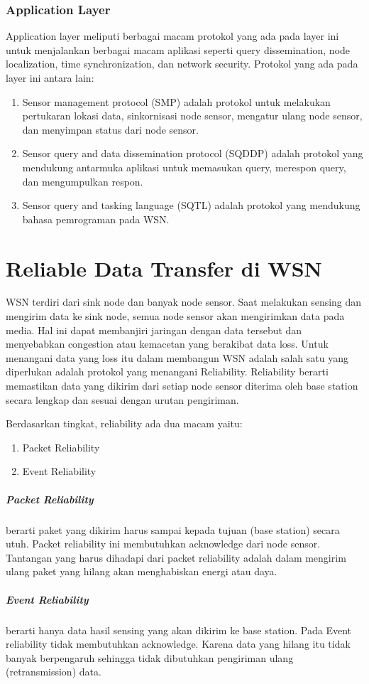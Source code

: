 \subsubsection{Application Layer}
Application layer meliputi berbagai macam protokol yang ada pada layer ini untuk menjalankan berbagai macam aplikasi seperti query dissemination, node localization, time synchronization, dan network security. Protokol yang ada pada layer ini antara lain:
\begin{enumerate}
	\item Sensor management protocol (SMP) adalah protokol untuk melakukan pertukaran lokasi data, sinkornisasi node sensor, mengatur ulang node sensor, dan menyimpan status dari node sensor.
	\item Sensor query and data dissemination protocol (SQDDP) adalah protokol yang mendukung antarmuka aplikasi untuk memasukan query, merespon query, dan mengumpulkan respon.
	\item Sensor query and tasking language (SQTL) adalah protokol yang mendukung bahasa pemrograman pada WSN.
\end{enumerate}


\section{Reliable Data Transfer di WSN}
WSN terdiri dari sink node dan banyak node sensor. Saat melakukan sensing dan mengirim data ke sink node, semua node sensor akan mengirimkan data pada media. Hal ini dapat membanjiri jaringan dengan data tersebut dan menyebabkan congestion atau kemacetan yang berakibat data loss. Untuk menangani data yang loss itu dalam membangun WSN adalah salah satu yang diperlukan adalah protokol yang menangani Reliability. Reliability berarti memastikan data yang dikirim dari setiap node sensor diterima oleh base station secara lengkap dan sesuai dengan urutan pengiriman.

Berdasarkan tingkat, reliability ada dua macam yaitu:
\begin{enumerate}
	\item Packet Reliability
	\item Event Reliability
\end{enumerate}  
\subparagraph{Packet Reliability} berarti paket yang dikirim harus sampai kepada tujuan (base station) secara utuh. Packet reliability ini membutuhkan acknowledge dari node sensor. Tantangan yang harus dihadapi dari packet reliability adalah dalam mengirim ulang paket yang hilang akan menghabiskan energi atau daya.
\subparagraph{Event Reliability} berarti hanya data hasil sensing yang akan dikirim ke base station. Pada Event reliability tidak membutuhkan acknowledge. Karena data yang hilang itu tidak banyak berpengaruh sehingga tidak dibutuhkan pengiriman ulang (retransmission) data.

